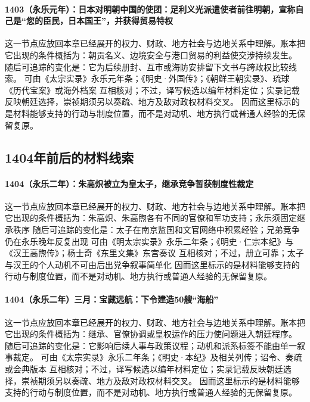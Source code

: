\paragraph{1403（永乐元年）：日本对明朝中国的使团：足利义光派遣使者前往明朝，宣称自己是“您的臣民，日本国王”，并获得贸易特权} 这一节点应放回本章已经展开的权力、财政、地方社会与边地关系中理解。账本把它出现的条件概括为：朝贡名义、边境安全与港口贸易的利益使交涉持续发生。 随后可追踪的变化是：它为后续册封、互市或海防安排留下文书与跨政权比较线索。 可由《太宗实录》永乐元年条；《明史·外国传》；《朝鲜王朝实录》、琉球《历代宝案》或海外档案 互相核对；不过，译写候选以编年材料定位；实录记载反映朝廷选择，崇祯期须另以奏疏、地方及敌对政权材料交叉。 因而这里标示的是材料能够支持的行动与制度位置，而不是对动机、地方执行或普通人经验的无保留复原。

\subsection{1404年前后的材料线索}

\paragraph{1404（永乐二年）：朱高炽被立为皇太子，继承竞争暂获制度性裁定} 这一节点应放回本章已经展开的权力、财政、地方社会与边地关系中理解。账本把它出现的条件概括为：朱高炽、朱高煦各有不同的官僚和军功支持；永乐须固定继承秩序 随后可追踪的变化是：太子在南京监国和文官网络中积累经验；兄弟竞争仍在永乐晚年反复出现 可由《明太宗实录》永乐二年条；《明史·仁宗本纪》与《汉王高煦传》；杨士奇《东里文集》东宫奏议 互相核对；不过，册立可靠；太子与汉王的个人动机不可由后出党争叙事简单化 因而这里标示的是材料能够支持的行动与制度位置，而不是对动机、地方执行或普通人经验的无保留复原。

\paragraph{1404（永乐二年）三月：宝藏远航：下令建造50艘“海船”} 这一节点应放回本章已经展开的权力、财政、地方社会与边地关系中理解。账本把它出现的条件概括为：继承、官僚协调或皇权运作的压力使问题进入朝廷程序。 随后可追踪的变化是：它影响后续人事与政策议程；动机和派系标签不能由单一叙事裁定。 可由《太宗实录》永乐二年条；《明史·本纪》及相关列传；诏令、奏疏或会典版本 互相核对；不过，译写候选以编年材料定位；实录记载反映朝廷选择，崇祯期须另以奏疏、地方及敌对政权材料交叉。 因而这里标示的是材料能够支持的行动与制度位置，而不是对动机、地方执行或普通人经验的无保留复原。

